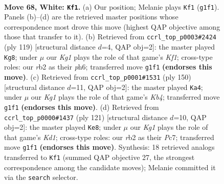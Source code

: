 \documentclass[11pt]{article}
\begin{document}
\clearpage

\begin{figure}[p]\centering
\begin{subfigure}{0.46\textwidth}\centering
\resizebox{\linewidth}{!}{%
\newchessgame
\chessboard[
  setfen={8/3k4/8/4p1p1/5p2/5B2/1r6/6K1 w - - 47 68},
  showmover=false,
  pgfstyle=straightmove, color=movearrow, markmove={g1-f1}
]}
\caption{}
\end{subfigure}\hfill
\begin{subfigure}{0.46\textwidth}\centering
\resizebox{\linewidth}{!}{%
\newchessgame
\chessboard[
  setfen={5k2/8/4K2P/6P1/5P2/8/1b6/8 b - - 0 60},
  showmover=false,
  pgfstyle=straightmove, color=movearrow, markmove={f8-g8}
]}
\caption{}
\end{subfigure}
\\[4pt]
\begin{subfigure}{0.46\textwidth}\centering
\resizebox{\linewidth}{!}{%
\newchessgame
\chessboard[
  setfen={8/5p2/6p1/6B1/1K4P1/8/4k3/8 w - - 2 76},
  showmover=false,
  pgfstyle=straightmove, color=movearrow, markmove={b4-a4}
]}
\caption{}
\end{subfigure}\hfill
\begin{subfigure}{0.46\textwidth}\centering
\resizebox{\linewidth}{!}{%
\newchessgame
\chessboard[
  setfen={3k3b/2p4P/8/5P2/6P1/8/6K1/8 b - - 0 61},
  showmover=false,
  pgfstyle=straightmove, color=movearrow, markmove={d8-e8}
]}
\caption{}
\end{subfigure}
\caption{\textbf{Move 68, White: \texttt{Kf1}.} (a) Our position; Melanie plays \texttt{Kf1} (\texttt{g1f1}). Panels (b)--(d) are the retrieved master positions whose correspondence most drove this move (highest QAP objective among those that transfer to it). (b) Retrieved from \texttt{ccrl\_top\_p0003\#2424} (ply 119) [structural distance $d$=4, QAP obj=2]: the master played \texttt{Kg8}; under $\mu$ our \emph{Kg1} plays the role of that game's \emph{Kf1}; cross-type roles: our \emph{r}b2 as their \emph{p}h6; transferred move \texttt{g1f1} \textbf{(endorses this move)}. (c) Retrieved from \texttt{ccrl\_top\_p0001\#1531} (ply 150) [structural distance $d$=11, QAP obj=2]: the master played \texttt{Ka4}; under $\mu$ our \emph{Kg1} plays the role of that game's \emph{Kb4}; transferred move \texttt{g1f1} \textbf{(endorses this move)}. (d) Retrieved from \texttt{ccrl\_top\_p0000\#1437} (ply 121) [structural distance $d$=10, QAP obj=2]: the master played \texttt{Ke8}; under $\mu$ our \emph{Kg1} plays the role of that game's \emph{Kd1}; cross-type roles: our \emph{r}b2 as their \emph{P}c7; transferred move \texttt{g1f1} \textbf{(endorses this move)}. Synthesis: 18 retrieved analogs transferred to \texttt{Kf1} (summed QAP objective 27, the strongest correspondence among the candidate moves); Melanie committed it via the \texttt{search} selector.}
\label{fig:thought-m134}
\end{figure}
\end{document}
